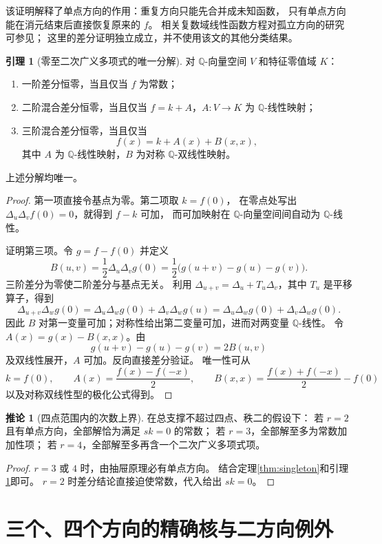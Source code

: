 \documentclass[UTF8,11pt,a4paper]{ctexart}
\theoremstyle{definition}
\newtheorem{lemma}[theorem]{引理}
\newtheorem{corollary}[theorem]{推论}
\newcommand{\Q}{\mathbb Q}
\numberwithin{equation}{section}
\begin{document}
该证明解释了单点方向的作用：重复方向只能先合并成未知函数，
只有单点方向能在消元结束后直接恢复原来的 $f$。
相关复数域线性函数方程对孤立方向的研究可参见\cite{KissVarga}；
这里的差分证明独立成立，并不使用该文的其他分类结果。

\begin{lemma}[零至二次广义多项式的唯一分解]\label{lem:lowdegree}
对 $\Q$-向量空间 $V$ 和特征零值域 $K$：
\begin{enumerate}
\item 一阶差分恒零，当且仅当 $f$ 为常数；
\item 二阶混合差分恒零，当且仅当 $f=k+A$，$A:V\to K$ 为 $\Q$-线性映射；
\item 三阶混合差分恒零，当且仅当
\[
 f(x)=k+A(x)+B(x,x),
\]
其中 $A$ 为 $\Q$-线性映射，$B$ 为对称 $\Q$-双线性映射。
\end{enumerate}
上述分解均唯一。
\end{lemma}
\begin{proof}
第一项直接令基点为零。第二项取 $k=f(0)$，
在零点处写出 $\Delta_u\Delta_vf(0)=0$，就得到 $f-k$ 可加，
而可加映射在 $\Q$-向量空间间自动为 $\Q$-线性。

证明第三项。令 $g=f-f(0)$ 并定义
\[
 B(u,v)=\frac12\Delta_u\Delta_vg(0)
 =\frac12\bigl(g(u+v)-g(u)-g(v)\bigr).
\]
三阶差分为零使二阶差分与基点无关。
利用 $\Delta_{u+v}=\Delta_u+T_u\Delta_v$，其中 $T_u$ 是平移算子，得到
\[
 \Delta_{u+v}\Delta_wg(0)
 =\Delta_u\Delta_wg(0)+\Delta_v\Delta_wg(u)
 =\Delta_u\Delta_wg(0)+\Delta_v\Delta_wg(0).
\]
因此 $B$ 对第一变量可加；对称性给出第二变量可加，进而对两变量 $\Q$-线性。
令 $A(x)=g(x)-B(x,x)$。由
\[
 g(u+v)-g(u)-g(v)=2B(u,v)
\]
及双线性展开，$A$ 可加。反向直接差分验证。
唯一性可从
\[
 k=f(0),\qquad
 A(x)=\frac{f(x)-f(-x)}2,\qquad
 B(x,x)=\frac{f(x)+f(-x)}2-f(0)
\]
以及对称双线性型的极化公式得到。
\end{proof}

\begin{corollary}[四点范围内的次数上界]\label{cor:degreebound}
在总支撑不超过四点、秩二的假设下：
若 $r=2$ 且有单点方向，全部解恰为满足 $sk=0$ 的常数；
若 $r=3$，全部解至多为常数加加性项；
若 $r=4$，全部解至多再含一个二次广义多项式项。
\end{corollary}
\begin{proof}
$r=3$ 或 $4$ 时，由抽屉原理必有单点方向。
结合定理\ref{thm:singleton}和引理\ref{lem:lowdegree}即可。
$r=2$ 时差分结论直接迫使常数，代入给出 $sk=0$。
\end{proof}

\section{三个、四个方向的精确核与二方向例外}\label{sec:kernelclassification}
\end{document}
